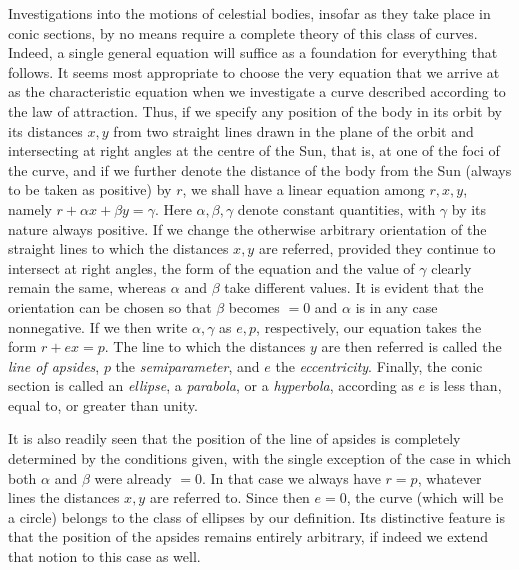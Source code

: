 Investigations into the motions of celestial bodies, insofar as they take place in conic sections, by no means require a complete theory of this class of curves. Indeed, a single general equation will suffice as a foundation for everything that follows. It seems most appropriate to choose the very equation that we arrive at as the characteristic equation when we investigate a curve described according to the law of attraction. Thus, if we specify any position of the body in its orbit by its distances $x, y$ from two straight lines drawn in the plane of the orbit and intersecting at right angles at the centre of the Sun, that is, at one of the foci of the curve, and if we further denote the distance of the body from the Sun (always to be taken as positive) by $r$, we shall have a linear equation among $r, x, y$, namely $r+\alpha x+\beta y=\gamma$. Here $\alpha, \beta, \gamma$ denote constant quantities, with $\gamma$ by its nature always positive. If we change the otherwise arbitrary orientation of the straight lines to which the distances $x, y$ are referred, provided they continue to intersect at right angles, the form of the equation and the value of $\gamma$ clearly remain the same, whereas $\alpha$ and $\beta$ take different values. It is evident that the orientation can be chosen so that $\beta$ becomes $=0$ and $\alpha$ is in any case nonnegative. If we then write $\alpha, \gamma$ as $e, p$, respectively, our equation takes the form $r+ex=p$. The line to which the distances $y$ are then referred is called the \emph{line of apsides}, $p$ the \emph{semiparameter}, and $e$ the \emph{eccentricity}. Finally, the conic section is called an \emph{ellipse}, a \emph{parabola}, or a \emph{hyperbola}, according as $e$ is less than, equal to, or greater than unity.

It is also readily seen that the position of the line of apsides is completely determined by the conditions given, with the single exception of the case in which both $\alpha$ and $\beta$ were already $=0$. In that case we always have $r=p$, whatever lines the distances $x, y$ are referred to. Since then $e=0$, the curve (which will be a circle) belongs to the class of ellipses by our definition. Its distinctive feature is that the position of the apsides remains entirely arbitrary, if indeed we extend that notion to this case as well.
